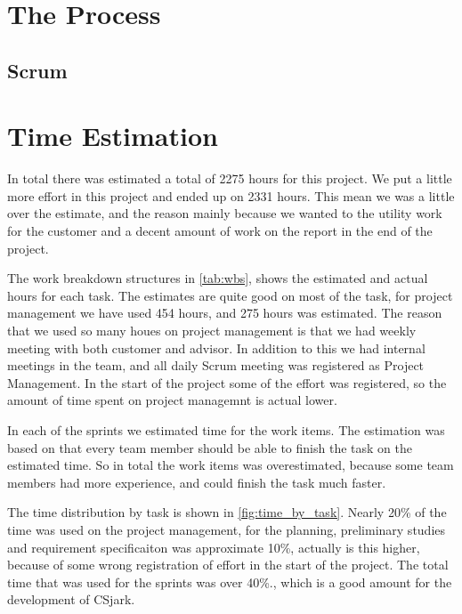 \section{The Process}
\subsection{Scrum}


\section{Time Estimation}
In total there was estimated a total of 2275 hours for this project. We put a 
little more effort in this project and ended up on 2331 hours. This mean we 
was a little over the estimate, and the reason mainly because we wanted to the 
utility work for the customer and a decent amount of work on the report in the 
end of the project. 

The work breakdown structures in \autoref{tab:wbs}, shows the estimated and 
actual hours for each task. The estimates are quite good on most of the task, 
for project management we have used 454 hours, and 275 hours was estimated. 
The reason that we used so many houes on project management is that we had 
weekly meeting with both customer and advisor. In addition to this we had 
internal meetings in the team, and all daily Scrum meeting was registered as 
Project Management. In the start of the project some of the effort was 
registered, so the amount of time spent on project managemnt is actual lower.

In each of the sprints we estimated time for the work items. The estimation 
was based on that every team member should be able to finish the task on the 
estimated time. So in total the work items was overestimated, because some 
team members had more experience, and could finish the task much faster.

The time distribution by task is shown in \autoref{fig:time_by_task}. Nearly 
20\% of the time was used on the project management, for the planning, 
preliminary studies and requirement specificaiton was approximate 10\%, 
actually is this higher, because of some wrong registration of effort in the 
start of the project. The total time that was used for the sprints was over 
40\%., which is a good amount for the development of CSjark. 

